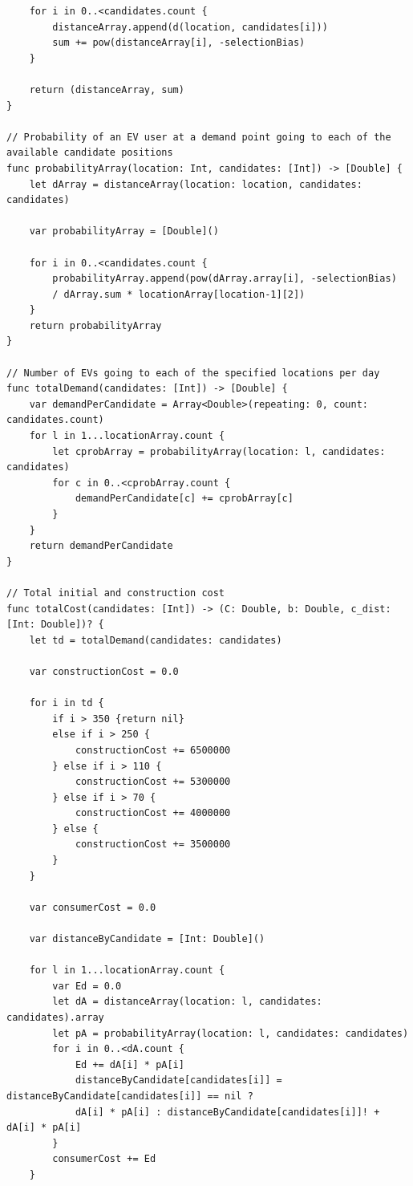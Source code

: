 \documentclass[10pt]{article}
\begin{document}
\begin{verbatim}
    for i in 0..<candidates.count {
        distanceArray.append(d(location, candidates[i]))
        sum += pow(distanceArray[i], -selectionBias)
    }
    
    return (distanceArray, sum)
}

// Probability of an EV user at a demand point going to each of the available candidate positions
func probabilityArray(location: Int, candidates: [Int]) -> [Double] {
    let dArray = distanceArray(location: location, candidates: candidates)
    
    var probabilityArray = [Double]()
    
    for i in 0..<candidates.count {
        probabilityArray.append(pow(dArray.array[i], -selectionBias)
        / dArray.sum * locationArray[location-1][2])
    }
    return probabilityArray
}

// Number of EVs going to each of the specified locations per day
func totalDemand(candidates: [Int]) -> [Double] {
    var demandPerCandidate = Array<Double>(repeating: 0, count: candidates.count)
    for l in 1...locationArray.count {
        let cprobArray = probabilityArray(location: l, candidates: candidates)
        for c in 0..<cprobArray.count {
            demandPerCandidate[c] += cprobArray[c]
        }
    }
    return demandPerCandidate
}

// Total initial and construction cost
func totalCost(candidates: [Int]) -> (C: Double, b: Double, c_dist: [Int: Double])? {
    let td = totalDemand(candidates: candidates)
    
    var constructionCost = 0.0
    
    for i in td {
        if i > 350 {return nil}
        else if i > 250 {
            constructionCost += 6500000
        } else if i > 110 {
            constructionCost += 5300000
        } else if i > 70 {
            constructionCost += 4000000
        } else {
            constructionCost += 3500000
        }
    }
    
    var consumerCost = 0.0
    
    var distanceByCandidate = [Int: Double]()
    
    for l in 1...locationArray.count {
        var Ed = 0.0
        let dA = distanceArray(location: l, candidates: candidates).array
        let pA = probabilityArray(location: l, candidates: candidates)
        for i in 0..<dA.count {
            Ed += dA[i] * pA[i]
            distanceByCandidate[candidates[i]] = distanceByCandidate[candidates[i]] == nil ?
            dA[i] * pA[i] : distanceByCandidate[candidates[i]]! + dA[i] * pA[i]
        }
        consumerCost += Ed
    }
    

\end{verbatim}
\end{document}
